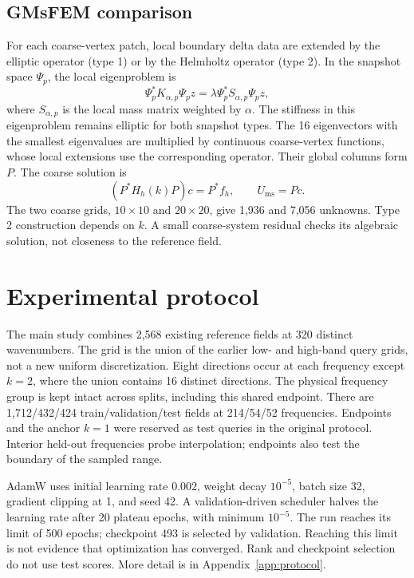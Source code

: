 \documentclass{article}
\begin{document}
\subsection{GMsFEM comparison}
For each coarse-vertex patch, local boundary delta data are extended by the elliptic operator (type 1) or by the Helmholtz operator (type 2). In the snapshot space $\Psi_p$, the local eigenproblem is
\begin{equation}
\Psi_p^*K_{\alpha,p}\Psi_p z
=\lambda\Psi_p^*S_{\alpha,p}\Psi_p z,
\end{equation}
where $S_{\alpha,p}$ is the local mass matrix weighted by $\alpha$. The stiffness in this eigenproblem remains elliptic for both snapshot types. The 16 eigenvectors with the smallest eigenvalues are multiplied by continuous coarse-vertex functions, whose local extensions use the corresponding operator. Their global columns form $P$. The coarse solution is
\begin{equation}
(P^*H_h(k)P)c=P^*f_h,\qquad U_{\mathrm{ms}}=Pc.
\end{equation}
The two coarse grids, $10\times10$ and $20\times20$, give 1,936 and 7,056 unknowns. Type 2 construction depends on $k$. A small coarse-system residual checks its algebraic solution, not closeness to the reference field.

\section{Experimental protocol}
The main study combines 2,568 existing reference fields at 320 distinct wavenumbers. The grid is the union of the earlier low- and high-band query grids, not a new uniform discretization. Eight directions occur at each frequency except $k=2$, where the union contains 16 distinct directions. The physical frequency group is kept intact across splits, including this shared endpoint. There are 1,712/432/424 train/validation/test fields at 214/54/52 frequencies. Endpoints and the anchor $k=1$ were reserved as test queries in the original protocol. Interior held-out frequencies probe interpolation; endpoints also test the boundary of the sampled range.

AdamW uses initial learning rate $0.002$, weight decay $10^{-5}$, batch size 32, gradient clipping at 1, and seed 42. A validation-driven scheduler halves the learning rate after 20 plateau epochs, with minimum $10^{-5}$. The run reaches its limit of 500 epochs; checkpoint 493 is selected by validation. Reaching this limit is not evidence that optimization has converged. Rank and checkpoint selection do not use test scores. More detail is in Appendix~\ref{app:protocol}.
\end{document}
